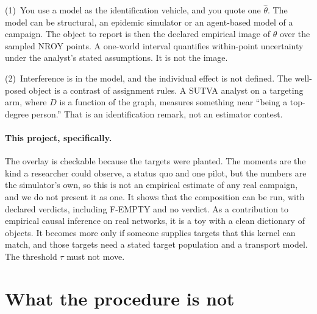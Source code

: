 \documentclass[11pt]{article}
\begin{document}
(1)~You use a model as the identification vehicle, and you quote one $\hat\theta$. The model can be structural, an epidemic simulator or an agent-based model of a campaign. The object to report is then the declared empirical image of
$\theta$ over the sampled NROY points. A one-world interval quantifies
within-point uncertainty under the analyst's stated assumptions. It is
not the image.

(2)~Interference is in the model, and the individual effect is not
defined. The well-posed object is a contrast of assignment rules. A
SUTVA analyst on a targeting arm, where $D$ is a function of the graph,
measures something near ``being a top-degree person.'' That is an
identification remark, not an estimator contest.

\paragraph{This project, specifically.}
The overlay is checkable because the targets were planted. The moments
are the kind a researcher could observe, a status quo and one pilot, but
the numbers are the simulator's own, so this is not an empirical
estimate of any real campaign, and we do not present it
as one. It shows that the composition can be run, with declared
verdicts, including F-EMPTY and no verdict. As a contribution to
empirical causal inference on real networks, it is a toy with a clean
dictionary of objects. It becomes more only if someone supplies targets
that this kernel can match, and those targets need a stated target
population and a transport model. The threshold $\tau$ must not move.

\section{What the procedure is not}
\label{sec:not}
\end{document}
